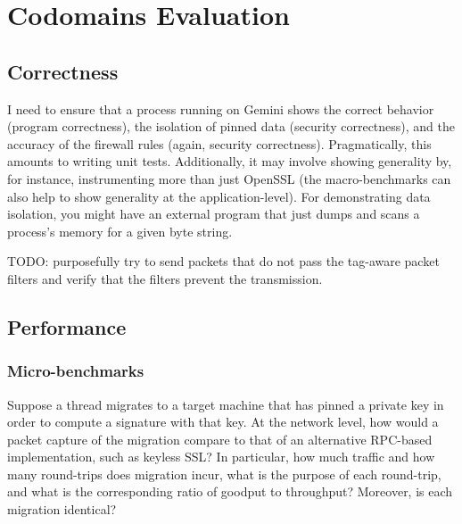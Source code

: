 \section{Codomains Evaluation}
\label{sec:codomains-eval}

\subsection{Correctness}
%
I need to ensure that a process running on Gemini shows the correct behavior
(program correctness), the isolation of pinned data (security correctness), and
the accuracy of the firewall rules (again, security correctness).
%
Pragmatically, this amounts to writing unit tests.
%
Additionally, it may involve showing generality by, for instance, instrumenting
more than just OpenSSL (the macro-benchmarks can also help to show generality
at the application-level).
%
For demonstrating data isolation, you might have an external program that just
dumps and scans a process's memory for a given byte string.




%
TODO: purposefully try to send packets that do not pass the tag-aware packet
filters and verify that the filters prevent the transmission.


\subsection{Performance}

\subsubsection{Micro-benchmarks}

%
Suppose a thread migrates to a target machine that has pinned a private key in
order to compute a signature with that key.
%
At the network level, how would a packet capture of the migration compare to
that of an alternative RPC-based implementation, such as keyless SSL\@?
%
In particular, how much traffic and how many round-trips does migration incur,
what is the purpose of each round-trip, and what is the corresponding ratio of
goodput to throughput?
%
Moreover, is each migration identical?


